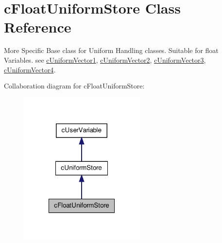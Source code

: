 \hypertarget{classc_float_uniform_store}{
\section{cFloatUniformStore Class Reference}
\label{classc_float_uniform_store}
}


More Specific Base class for Uniform Handling classes. Suitable for float Variables. see \hyperlink{classc_uniform_vector1}{cUniformVector1}, \hyperlink{classc_uniform_vector2}{cUniformVector2}, \hyperlink{classc_uniform_vector3}{cUniformVector3}, \hyperlink{classc_uniform_vector4}{cUniformVector4}.  




Collaboration diagram for cFloatUniformStore:\nopagebreak
\begin{figure}[H]
\begin{center}
\leavevmode
\includegraphics[width=180pt]{classc_float_uniform_store__coll__graph}
\end{center}
\end{figure}
